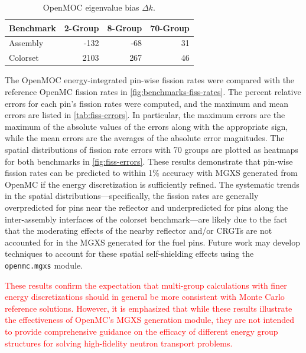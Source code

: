 \begin{table}[h!]
  \centering
  \caption{OpenMOC eigenvalue bias $\Delta k$.}
  \label{tab:keff-bias}
  \begin{tabular}{l r r r}
  \toprule
  \textbf{Benchmark} & \textbf{2-Group} & \textbf{8-Group} & \textbf{70-Group} \\
  \midrule
  Assembly & -132 & -68 & 31 \\
  \midrule
  Colorset & 2103 & 267 & 46 \\
  \bottomrule
\end{tabular}
\end{table}

The OpenMOC energy-integrated pin-wise fission rates were compared with the reference OpenMC fission rates in \cref{fig:benchmarks-fiss-rates}. The percent relative errors for each pin's fission rates were computed, and the maximum and mean errors are listed in \cref{tab:fiss-errors}. In particular, the maximum errors are the maximum of the absolute values of the errors along with the appropriate sign, while the mean errors are the averages of the absolute error magnitudes. The spatial distributions of fission rate errors with 70 groups are plotted as heatmaps for both benchmarks in \cref{fig:fiss-errors}. These results demonstrate that pin-wise fission rates can be predicted to within 1\% accuracy with MGXS generated from OpenMC if the energy discretization is sufficiently refined. The systematic trends in the spatial distributions---specifically, the fission rates are generally overpredicted for pins near the reflector and underpredicted for pins along the inter-assembly interfaces of the colorset benchmark---are likely due to the fact that the moderating effects of the nearby reflector and/or CRGTs are not accounted for in the MGXS generated for the fuel pins. Future work may develop techniques to account for these spatial self-shielding effects using the \texttt{openmc.mgxs} module.

\textcolor{red}{These results confirm the expectation that multi-group calculations with finer energy discretizations should in general be more consistent with Monte Carlo reference solutions. However, it is emphasized that while these results illustrate the effectiveness of OpenMC's MGXS generation module, they are not intended to provide comprehensive guidance on the efficacy of different energy group structures for solving high-fidelity neutron transport problems.}

